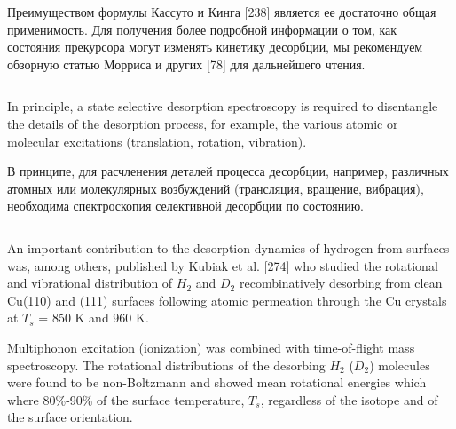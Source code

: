 \documentclass[11pt]{article}
\makeatletter
\newcommand{\boxspacing}{\kern\kvtcb@left@rule\kern\kvtcb@boxsep}
\newcommand{\prompt}[4]{
        {\ttfamily\llap{{\color{#2}[#3]:\hspace{3pt}#4}}\vspace{-\baselineskip}}
    }
\makeatother
\begin{document}
Преимуществом формулы Кассуто и Кинга {[}238{]} является ее достаточно
общая применимость. Для получения более подробной информации о том, как
состояния прекурсора могут изменять кинетику десорбции, мы рекомендуем
обзорную статью Морриса и других {[}78{]} для дальнейшего чтения.

    \begin{tcolorbox}[breakable, size=fbox, boxrule=1pt, pad at break*=1mm,colback=cellbackground, colframe=cellborder]
\prompt{In}{incolor}{ }{\boxspacing}
\begin{Verbatim}[commandchars=\\\{\}]

\end{Verbatim}
\end{tcolorbox}

    In principle, a state selective desorption spectroscopy is required to
disentangle the details of the desorption process, for example, the
various atomic or molecular excitations (translation, rotation,
vibration).

    В принципе, для расчленения деталей процесса десорбции, например,
различных атомных или молекулярных возбуждений (трансляция, вращение,
вибрация), необходима спектроскопия селективной десорбции по состоянию.

    \begin{tcolorbox}[breakable, size=fbox, boxrule=1pt, pad at break*=1mm,colback=cellbackground, colframe=cellborder]
\prompt{In}{incolor}{ }{\boxspacing}
\begin{Verbatim}[commandchars=\\\{\}]

\end{Verbatim}
\end{tcolorbox}

    An important contribution to the desorption dynamics of hydrogen from
surfaces was, among others, published by Kubiak et al. {[}274{]} who
studied the rotational and vibrational distribution of \(H_2\) and
\(D_2\) recombinatively desorbing from clean Cu(110) and (111) surfaces
following atomic permeation through the Cu crystals at \(T_s\) = 850 K
and 960 K.

Multiphonon excitation (ionization) was combined with time-of-flight
mass spectroscopy. The rotational distributions of the desorbing \(H_2\)
(\(D_2\)) molecules were found to be non-Boltzmann and showed mean
rotational energies which where 80\%-90\% of the surface temperature,
\(T_s\), regardless of the isotope and of the surface orientation.
\end{document}
